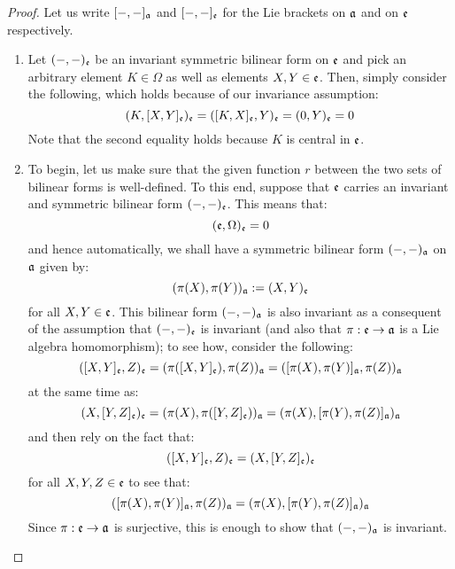             \begin{proof}
                Let us write $[-, -]_{\mathfrak{a}}$ and $[-, -]_{\mathfrak{e}}$ for the Lie brackets on $\mathfrak{a}$ and on $\mathfrak{e}$ respectively. 

                \begin{enumerate}
                    \item Let $(-, -)_{\mathfrak{e}}$ be an invariant symmetric bilinear form on $\mathfrak{e}$ and pick an arbitrary element $K \in \Omega$ as well as elements $X, Y \in \mathfrak{e}$. Then, simply consider the following, which holds because of our invariance assumption:
                        $$(K, [X, Y]_{\mathfrak{e}})_{\mathfrak{e}} = ([K, X]_{\mathfrak{e}}, Y)_{\mathfrak{e}} = (0, Y)_{\mathfrak{e}} = 0$$
                    Note that the second equality holds because $K$ is central in $\mathfrak{e}$.
                    \item To begin, let us make sure that the given function $r$ between the two sets of bilinear forms is well-defined. To this end, suppose that $\mathfrak{e}$ carries an invariant and symmetric bilinear form $(-, -)_{\mathfrak{e}}$. This means that:
                        $$(\mathfrak{e}, \Omega)_{\mathfrak{e}} = 0$$
                    and hence automatically, we shall have a symmetric bilinear form $(-, -)_{\mathfrak{a}}$ on $\mathfrak{a}$ given by:
                        $$(\pi(X), \pi(Y))_{\mathfrak{a}} := (X, Y)_{\mathfrak{e}}$$
                    for all $X, Y \in \mathfrak{e}$. This bilinear form $(-, -)_{\mathfrak{a}}$ is also invariant as a consequent of the assumption that $(-, -)_{\mathfrak{e}}$ is invariant (and also that $\pi: \mathfrak{e} \to \mathfrak{a}$ is a Lie algebra homomorphism); to see how, consider the following:
                        $$( [X, Y]_{\mathfrak{e}}, Z )_{\mathfrak{e}} = ( \pi( [X, Y]_{\mathfrak{e}} ), \pi(Z) )_{\mathfrak{a}} = ( [\pi(X), \pi(Y)]_{\mathfrak{a}}, \pi(Z) )_{\mathfrak{a}}$$
                    at the same time as:
                        $$( X, [Y, Z]_{\mathfrak{e}} )_{\mathfrak{e}} = ( \pi(X), \pi([Y, Z]_{\mathfrak{e}}) )_{\mathfrak{a}} = ( \pi(X), [\pi(Y), \pi(Z)]_{\mathfrak{a}} )_{\mathfrak{a}}$$
                    and then rely on the fact that:
                        $$( [X, Y]_{\mathfrak{e}}, Z )_{\mathfrak{e}} = ( X, [Y, Z]_{\mathfrak{e}} )_{\mathfrak{e}}$$
                    for all $X, Y, Z \in \mathfrak{e}$ to see that:
                        $$( [\pi(X), \pi(Y)]_{\mathfrak{a}}, \pi(Z) )_{\mathfrak{a}} = ( \pi(X), [\pi(Y), \pi(Z)]_{\mathfrak{a}} )_{\mathfrak{a}}$$
                    Since $\pi: \mathfrak{e} \to \mathfrak{a}$ is surjective, this is enough to show that $(-, -)_{\mathfrak{a}}$ is invariant.
                

\end{enumerate}
\end{proof}
